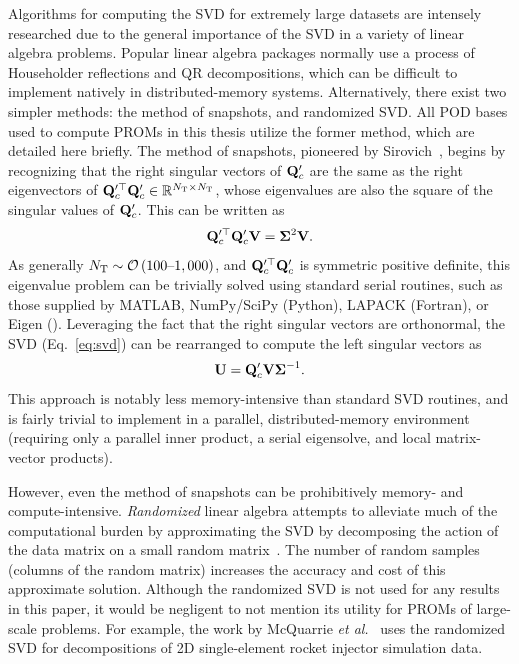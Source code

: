 Algorithms for computing the SVD for extremely large datasets are intensely researched due to the general importance of the SVD in a variety of linear algebra problems. Popular linear algebra packages normally use a process of Householder reflections and QR decompositions, which can be difficult to implement natively in distributed-memory systems. Alternatively, there exist two simpler methods: the method of snapshots, and randomized SVD. All POD bases used to compute PROMs in this thesis utilize the former method, which are detailed here briefly. The method of snapshots, pioneered by Sirovich~\cite{Sirovich1987}, begins by recognizing that the right singular vectors of $\consDataMatUns$ are the same as the right eigenvectors of $\consDataMatUns^\top \consDataMatUns \inRTwo{\numSnaps}{\numSnaps}$, whose eigenvalues are also the square of the singular values of $\consDataMatUns$. This can be written as
%
\begin{equation}
	\consDataMatUns^\top \consDataMatUns \rightEvecMat = \singVecMat^2 \rightEvecMat.
\end{equation}
%
As generally $N_{\text{T}}\sim\mathcal{O}\left(100\text{--}1,000\right)$, and $\consDataMatUns^\top \consDataMatUns$ is symmetric positive definite, this eigenvalue problem can be trivially solved using standard serial routines, such as those supplied by MATLAB, NumPy/SciPy (Python), LAPACK (Fortran), or Eigen (\CC). Leveraging the fact that the right singular vectors are orthonormal, the SVD (Eq.~\ref{eq:svd}) can be rearranged to compute the left singular vectors as
%
\begin{equation}
	\leftEvecMat = \consDataMatUns \rightEvecMat \singVecMat^{-1}.
\end{equation}
%
This approach is notably less memory-intensive than standard SVD routines, and is fairly trivial to implement in a parallel, distributed-memory environment (requiring only a parallel inner product, a serial eigensolve, and local matrix-vector products).

However, even the method of snapshots can be prohibitively memory- and compute-intensive. \textit{Randomized} linear algebra attempts to alleviate much of the computational burden by approximating the SVD by decomposing the action of the data matrix on a small random matrix~\cite{Halko2011}. The number of random samples (columns of the random matrix) increases the accuracy and cost of this approximate solution. Although the randomized SVD is not used for any results in this paper, it would be negligent to not mention its utility for PROMs of large-scale problems. For example, the work by McQuarrie \textit{et al.}~\cite{McQuarrie2021} uses the randomized SVD for decompositions of 2D single-element rocket injector simulation data.


